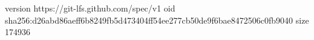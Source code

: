 version https://git-lfs.github.com/spec/v1
oid sha256:d26abd86aeff6b8249fb5d473404ff54ee277cb50de9f6bae8472506c0fb9040
size 174936
